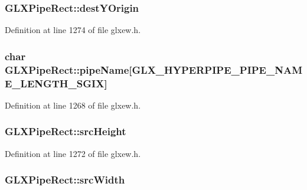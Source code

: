 \hypertarget{struct_g_l_x_pipe_rect_aef7766b02ef07c20a11e89da5878b469}{}
\subsubsection[{dest\+Y\+Origin}]{ G\+L\+X\+Pipe\+Rect\+::dest\+Y\+Origin}\label{struct_g_l_x_pipe_rect_aef7766b02ef07c20a11e89da5878b469}


Definition at line 1274 of file glxew.\+h.

\hypertarget{struct_g_l_x_pipe_rect_aa4c4f60e9647705ddefa10f95a37cb79}{}
\subsubsection[{pipe\+Name}]{\setlength{\rightskip}{0pt plus 5cm}char G\+L\+X\+Pipe\+Rect\+::pipe\+Name\mbox{[}{\bf G\+L\+X\+\_\+\+H\+Y\+P\+E\+R\+P\+I\+P\+E\+\_\+\+P\+I\+P\+E\+\_\+\+N\+A\+M\+E\+\_\+\+L\+E\+N\+G\+T\+H\+\_\+\+S\+G\+I\+X}\mbox{]}}\label{struct_g_l_x_pipe_rect_aa4c4f60e9647705ddefa10f95a37cb79}


Definition at line 1268 of file glxew.\+h.

\hypertarget{struct_g_l_x_pipe_rect_a35632524bce6bffa05f284a9b1c1b8ff}{}
\subsubsection[{src\+Height}]{ G\+L\+X\+Pipe\+Rect\+::src\+Height}\label{struct_g_l_x_pipe_rect_a35632524bce6bffa05f284a9b1c1b8ff}


Definition at line 1272 of file glxew.\+h.

\hypertarget{struct_g_l_x_pipe_rect_a2c6c180a4dabb71076366e06a1c7d0ef}{}
\subsubsection[{src\+Width}]{ G\+L\+X\+Pipe\+Rect\+::src\+Width}\label{struct_g_l_x_pipe_rect_a2c6c180a4dabb71076366e06a1c7d0ef}



